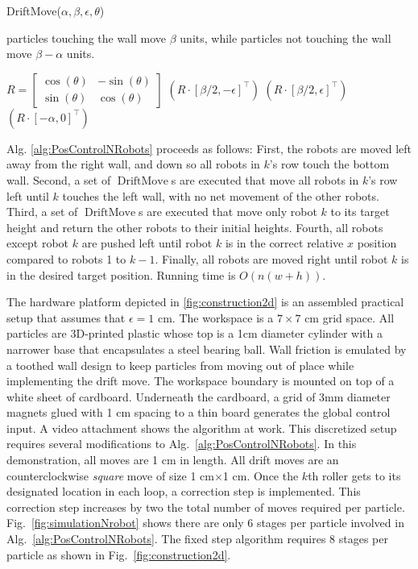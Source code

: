 \begin{algorithm}
\caption{ {\sc DriftMove}($\alpha,\beta,\epsilon,\theta$)
}\label{alg:DriftMove}
particles touching the wall move $\beta$ units, while particles not touching the wall move $\beta-\alpha$ units.
\begin{algorithmic}[1]
\State $R = \begin{bmatrix} \cos(\theta) & -\sin(\theta) \\
 \sin(\theta) & \cos(\theta)  \end{bmatrix}$
$(R \cdot [\beta/2,-\epsilon]^\top)$ 
$(R \cdot [\beta/2,\epsilon]^\top)$ 
$(R \cdot [-\alpha,0]^\top)$ 
\end{algorithmic}
\end{algorithm}


Alg. \ref{alg:PosControlNRobots} proceeds as follows:  
First, the robots are moved left away from the right wall, and down so all robots in $k$'s row touch the bottom wall.
Second, a set of $\operatorname{DriftMove}$s are executed that move all robots in $k$'s row left until $k$ touches the left wall, with no net movement of the other robots.
Third, a set of $\operatorname{DriftMove}$s are executed that move only robot $k$ to its target height and return the other robots to their initial heights. 
Fourth, all robots except robot $k$ are pushed left until robot $k$ is in the correct relative $x$ position compared to robots 1 to $k-1$.
Finally, all robots are moved right until robot $k$ is in the desired target position. Running time is $O(n(w+h))$.



The hardware platform depicted in \ref{fig:construction2d} is an assembled practical setup that assumes that $\epsilon= 1$ cm. 
The workspace is a $7\times 7$ cm grid space. 
All particles are 3D-printed plastic whose top is a 1cm diameter cylinder with a narrower base that encapsulates a steel bearing ball.
Wall friction is emulated by a toothed wall design to keep particles from moving out of place while implementing the drift move. 
The workspace boundary is mounted on top of a white sheet of cardboard.
Underneath the cardboard, a grid of 3mm diameter magnets glued with 1 cm spacing to a thin board generates the global control input.
 A video attachment  shows the algorithm at work. 
This discretized setup requires several modifications to Alg.~\ref{alg:PosControlNRobots}.
 In this demonstration, all moves are 1 cm in length.
   All drift moves are an counterclockwise \emph{square} move  of size 1 cm$\times$1 cm. 
   Once the $k$th roller gets to its designated location in each loop, a correction step is implemented. 
   This correction step increases by two the total number of moves required per particle.
   Fig.~\ref{fig:simulationNrobot} shows there are only 6 stages per particle involved in Alg.~\ref{alg:PosControlNRobots}.
The fixed step algorithm requires 8 stages per particle as shown in Fig.~\ref{fig:construction2d}. 

